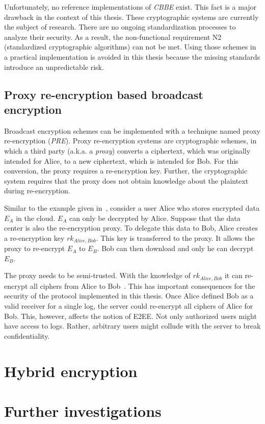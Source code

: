 \documentclass[../main.tex]{subfiles}
\begin{document}
Unfortunately, no reference implementations of \textit{CBBE} exist. 
This fact is a major drawback in the context of this thesis.
These cryptographic systems are currently the subject of research.
There are no ongoing standardization processes to analyze their security.
As a result, the non-functional requirement N2 (standardized cryptographic algorithms) can not be met.
Using those schemes in a practical implementation is avoided in this thesis because the missing standards introduce an unpredictable risk.

\subsection{Proxy re-encryption based broadcast encryption}
Broadcast encryption schemes can be implemented with a technique named proxy re-encryption (\textit{PRE}).
Proxy re-encryption systems are cryptographic schemes, in which a third party (a.k.a. a \textit{proxy}) converts a ciphertext, which was originally intended for Alice, to a new ciphertext, which is intended for Bob. 
For this conversion, the proxy requires a re-encryption key. 
Further, the cryptographic system requires that the proxy does not obtain knowledge about the plaintext during re-encryption.~\cite{Chen2018}

Similar to the example given in~\cite{Chen2018}, consider a user Alice who stores encrypted data $E_A$ in the cloud.
$E_A$ can only be decrypted by Alice.
Suppose that the data center is also the re-encryption proxy.
To delegate this data to Bob, Alice creates a re-encryption key $rk_{Alice,Bob}$. 
This key is transferred to the proxy.
It allows the proxy to re-encrypt $E_A$ to $E_B$.
Bob can then download and only he can decrypt $E_B$.

The proxy needs to be semi-trusted.
With the knowledge of $rk_{Alice,Bob}$ it can re-encrypt all ciphers from Alice to Bob~\cite{Chen2018}.
This has important consequences for the security of the protocol implemented in this thesis.
Once Alice defined Bob as a valid receiver for a single log, the server could re-encrypt all ciphers of Alice for Bob.
This, however, affects the notion of E2EE.
Not only authorized users might have access to logs.
Rather, arbitrary users might collude with the server to break confidentiality.
\section{Hybrid encryption}

\section{Further investigations}
\end{document}
